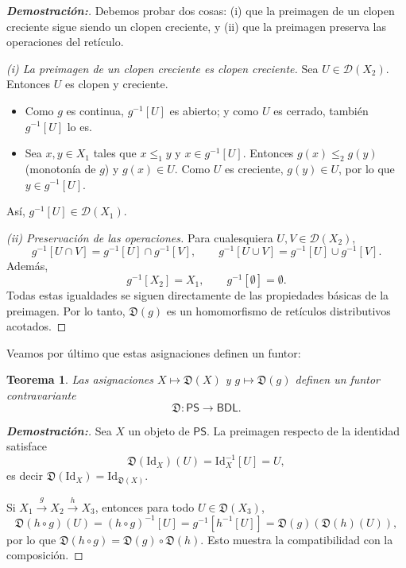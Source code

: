 \documentclass[12pt]{book}
\newtheorem{theorem}{Teorema}[section]
\newcommand{\Id}{\mathrm{Id}}
\newcommand{\D}{\mathfrak{D}}
\begin{document}
\begin{proof}[{\textbf{Demostración:}}]
Debemos probar dos cosas: (i) que la preimagen de un clopen creciente sigue 
siendo un clopen creciente, y (ii) que la preimagen preserva las operaciones del retículo.

\smallskip
\noindent\emph{(i) La preimagen de un clopen creciente es clopen creciente.}
Sea \(U\in \mathcal{D}(X_{2})\). Entonces \(U\) es clopen y creciente.

\begin{itemize}
    \item Como \(g\) es continua, \(g^{-1}[U]\) es abierto; y como \(U\) es cerrado, 
          también \(g^{-1}[U]\) lo es.
    \item Sea \(x,y\in X_{1}\) tales que \(x\leq_{1} y\) y \(x\in g^{-1}[U]\).  
          Entonces \(g(x)\leq_{2}g(y)\) (monotonía de \(g\)) y \(g(x)\in U\).  
          Como \(U\) es creciente, \(g(y)\in U\), por lo que \(y\in g^{-1}[U]\).
\end{itemize}
Así, \(g^{-1}[U]\in \mathcal{D}(X_{1})\).

\smallskip
\noindent\emph{(ii) Preservación de las operaciones.}
Para cualesquiera \(U,V\in \mathcal{D}(X_{2})\),
\[
g^{-1}[U\cap V]=g^{-1}[U]\cap g^{-1}[V],
\qquad
g^{-1}[U\cup V]=g^{-1}[U]\cup g^{-1}[V].
\]
Además,
\[
g^{-1}[X_{2}]=X_{1},
\qquad
g^{-1}[\emptyset]=\emptyset.
\]
Todas estas igualdades se siguen directamente de las propiedades básicas de la 
preimagen. Por lo tanto, \(\D(g)\) es un homomorfismo de retículos distributivos acotados.
\end{proof}
Veamos por último que estas asignaciones definen un funtor:
\begin{theorem}
Las asignaciones $X\longmapsto\D(X)$ y $g\longmapsto\D(g)$ definen un funtor contravariante
\[
\D\colon\mathsf{PS}\to\mathsf{BDL}.
\]
\end{theorem}

\begin{proof}[{\textbf{Demostración:}}]
Sea \(X\) un objeto de \(\mathsf{PS}\).  
La preimagen respecto de la identidad satisface
\[
\D(\Id_{X})(U)=\Id_{X}^{-1}[U]=U,
\]
es decir \(\D(\Id_{X})=\Id_{\D(X)}\).

Si 
\(
X_{1}\xrightarrow{g}X_{2}\xrightarrow{h}X_{3}
\),
entonces para todo \(U\in\D(X_{3})\),
\[
\D(h\circ g)(U)
=(h\circ g)^{-1}[U]
=g^{-1}[h^{-1}[U]]
=\D(g)(\D(h)(U)),
\]
por lo que \(\D(h\circ g)=\D(g)\circ \D(h)\).  
Esto muestra la compatibilidad con la composición.
\end{proof}
\end{document}
